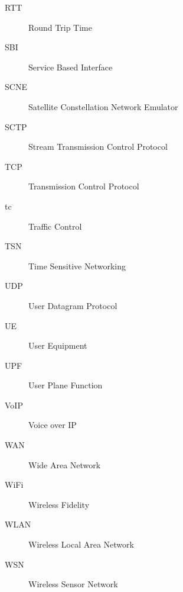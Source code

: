 \begin{description}
\item[RTT] Round Trip Time
\item[SBI] Service Based Interface
\item[SCNE] Satellite Constellation Network Emulator
\item[SCTP] Stream Transmission Control Protocol
\item[TCP] Transmission Control Protocol
\item[tc] Traffic Control
\item[TSN] Time Sensitive Networking
\item[UDP] User Datagram Protocol
\item[UE] User Equipment
\item[UPF] User Plane Function 
\item[VoIP] Voice over IP
\item[WAN] Wide Area Network
\item[WiFi] Wireless Fidelity
\item[WLAN] Wireless Local Area Network
\item[WSN] Wireless Sensor Network


\end{description}